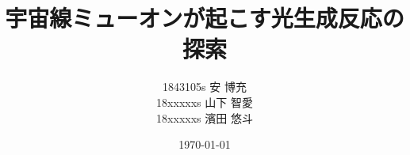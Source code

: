 \documentclass[a4paper,uplatex]{jsreport}
\begin{document}
\title{宇宙線ミューオンが起こす光生成反応の探索}
\author{1843105s 安 博充\\
        18xxxxxs 山下 智愛\\
        18xxxxxs 濱田 悠斗
}
\date{\today} %

\maketitle %
\tableofcontents %












\end{document}
